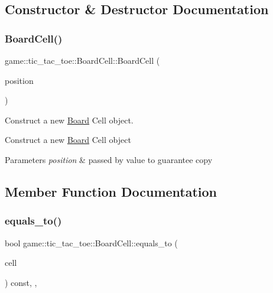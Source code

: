 \subsection{Constructor \& Destructor Documentation}
\mbox{\label{classgame_1_1tic__tac__toe_1_1_board_cell_abef7037c86f1ca3bcac123fc9383ae90}} 
\subsubsection{\texorpdfstring{Board\+Cell()}{BoardCell()}}
{\footnotesize\ttfamily game\+::tic\+\_\+tac\+\_\+toe\+::\+Board\+Cell\+::\+Board\+Cell (\begin{DoxyParamCaption}\item[{const \hyperlink{structgame_1_1_position}{Position} \&}]{position }\end{DoxyParamCaption})\hspace{0.3cm}{\ttfamily [explicit]}}



Construct a new \hyperlink{classgame_1_1tic__tac__toe_1_1_board}{Board} Cell object. 

Construct a new \hyperlink{classgame_1_1tic__tac__toe_1_1_board}{Board} Cell object


\begin{DoxyParams}{Parameters}
{\em position} & passed by value to guarantee copy \\
\hline
\end{DoxyParams}


\subsection{Member Function Documentation}
\mbox{\label{classgame_1_1tic__tac__toe_1_1_board_cell_a909bb91d32553cebbe9749bd6814b8f4}} 
\subsubsection{\texorpdfstring{equals\+\_\+to()}{equals\_to()}}
{\footnotesize\ttfamily bool game\+::tic\+\_\+tac\+\_\+toe\+::\+Board\+Cell\+::equals\+\_\+to (\begin{DoxyParamCaption}\item[{const \hyperlink{classgame_1_1_abstract_board_cell}{Abstract\+Board\+Cell} \&}]{cell }\end{DoxyParamCaption}) const\hspace{0.3cm}{\ttfamily [override]}, {\ttfamily [protected]}, {\ttfamily [virtual]}}



